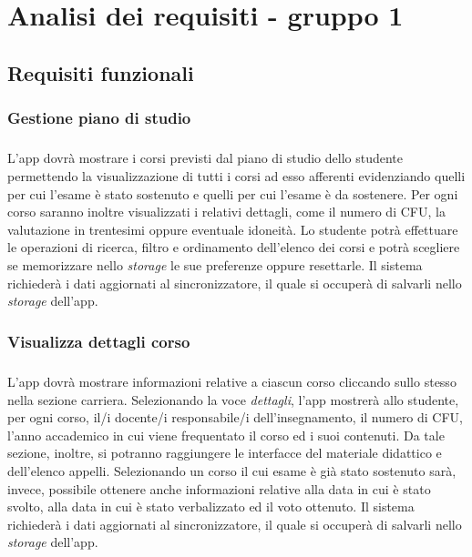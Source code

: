 
\chapter{Analisi dei requisiti - gruppo 1}
\label{ref:requisiti1}


\section{Requisiti funzionali}

\subsection{Gestione piano di studio}
\paragraph{} 
L’app dovrà mostrare i corsi previsti dal piano di studio dello studente permettendo la visualizzazione di tutti i corsi ad esso afferenti evidenziando quelli per cui l’esame è stato sostenuto e quelli per cui l’esame è da sostenere. Per ogni corso saranno inoltre visualizzati i relativi dettagli, come il numero di CFU, la valutazione in trentesimi oppure eventuale idoneità. Lo studente potrà effettuare le operazioni di ricerca, filtro e ordinamento dell'elenco dei corsi e potrà scegliere se memorizzare nello \textit{storage} le sue preferenze oppure resettarle. Il sistema richiederà i dati aggiornati al sincronizzatore, il quale si occuperà di salvarli nello \textit{storage} dell’app.
\subsection{Visualizza dettagli corso}
\paragraph{} 
L’app dovrà mostrare informazioni relative a ciascun corso cliccando sullo stesso nella sezione carriera. Selezionando la voce \textit{dettagli}, l’app mostrerà allo studente, per ogni corso, il/i docente/i responsabile/i dell’insegnamento, il numero di CFU, l’anno accademico in cui viene frequentato il corso ed i suoi contenuti. Da tale sezione, inoltre, si potranno raggiungere le interfacce del materiale didattico e dell’elenco appelli. Selezionando un corso il cui esame è già stato sostenuto sarà, invece, possibile ottenere anche informazioni relative alla data in cui è stato svolto, alla data in cui è stato verbalizzato ed il voto ottenuto. Il sistema richiederà i dati aggiornati al sincronizzatore, il quale si occuperà di salvarli nello \textit{storage} dell’app.


